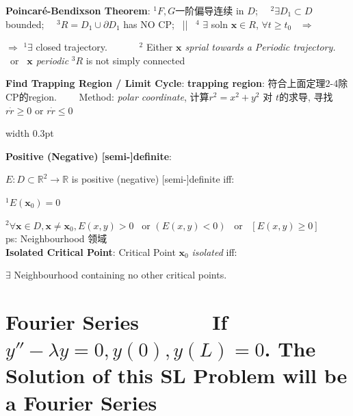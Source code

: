 \documentclass[8pt]{extarticle}
\begin{document}
\begin{minipage}[t]{0.71\textwidth}
    \textbf{Poincaré-Bendixson Theorem}: { $^1F,G${\scriptsize 一阶偏导连续} in $D$; \ \ $^2\exists D_1\subset D$ bounded; \ \ $^3R=D_1\cup\partial D_1$ has NO CP; \ || \ $^4$ $\exists$ soln $\mathbf{x}\in R$, $\forall t\geq t_0$ \ $\Rightarrow$}
    
    \hspace{78pt} $\Rightarrow$ $^1\exists$ closed trajectory. \ \ \ \ \ \ $^2$ Either \textit{$\mathbf{x}$ sprial towards a Periodic trajectory.} \ or \ \textit{$\mathbf{x}$ periodic} $^3R$ is not simply connected
    
    \textbf{Find Trapping Region / Limit Cycle}: {\scriptsize \textbf{trapping region}: 符合上面定理2-4除CP的region. \ \ \ \ Method: \textit{polar coordinate}, 计算$r^2=x^2+y^2$ 对 $t$的求导, 寻找$r\dot{r}\geq0$ or $r\dot{r}\leq0$}
    

\end{minipage}
\hfill
\vrule width 0.3pt
\hfill
\begin{minipage}[t]{0.28\textwidth}

    \textbf{Positive (Negative) [semi-]definite}: 
    
    $E:D\subset\mathbb{R}^2\to\mathbb{R}$ is positive (negative) [semi-]definite iff: 
    
    $^1E(\mathbf{x}_0)=0$
    
    $^2\forall\mathbf{x}\in D,\textbf{x}\ne\mathbf{x}_0,E(x,y)>0$ \ {\scriptsize or $(E(x,y)<0)$ \ or \ $[E(x,y)\geq0]$} \\

    ps: Neighbourhood 领域 \\

    \textbf{Isolated Critical Point}: Critical Point $\mathbf{x}_0$ \textit{isolated} iff:
    
    $\exists$ Neighbourhood containing no other critical points.

\end{minipage}


\section{Fourier Series \ \ \ \ \ \ {\tiny If $y''-\lambda y=0,y(0),y(L)=0$. The Solution of this SL Problem will be a Fourier Series}}

\vspace{-2pt}
\hspace{20pt}{\tiny * BVPs 可能没有解/一个解/无数解; IVP 只会有一个解}
\vspace{-2pt}
\end{document}
